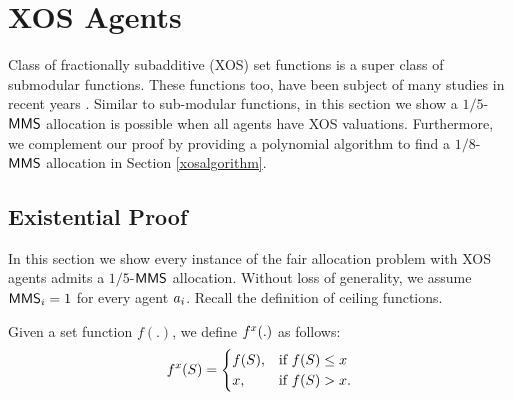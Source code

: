 \section{XOS Agents}\label{xos}
Class of fractionally subadditive (XOS) set functions is a super class of submodular functions. These functions too, have been subject of many studies in recent years \cite{christodoulou2008bayesian, bhawalkar2011welfare, feige2009maximizing,blumrosen2007welfare, syrgkanis2012bayesian,feldman2013simultaneous,fu2012conditional,feldmancombinatorial,milchtaich1996congestion}. Similar to sub-modular functions, in this section we show a $1/5$-$\mathsf{MMS}$ allocation is possible when all agents have XOS valuations. Furthermore, we complement our proof by providing a polynomial algorithm to find a $1/8$-$\mathsf{MMS}$ allocation in Section \ref{xosalgorithm}.

 
 
\subsection{Existential Proof}\label{ep}
In this section we show every instance of the fair allocation problem with XOS agents admits a $1/5$-$\mathsf{MMS}$ allocation. 
Without loss of generality, we assume $\mathsf{MMS}_i = 1$ for every agent $a_i$. Recall the definition of ceiling functions.
\begin{definition}\label{fxfunction}
Given a set function $f(.)$, we define $f^{x}(.)$ as follows:
$$f^{x}(S) =
\begin{cases}
	f(S), & \text{if }f(S) \leq x \\
	x, & \text{if }f(S) > x.
\end{cases}$$

\end{definition}

